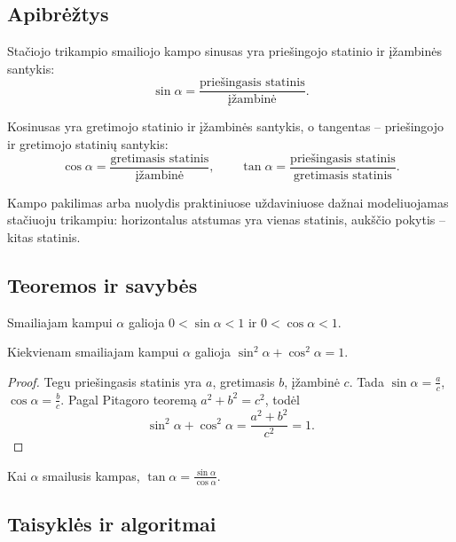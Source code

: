 \subsection{Apibrėžtys}

\begin{apibreztis}
Stačiojo trikampio smailiojo kampo sinusas yra priešingojo statinio ir įžambinės santykis:
\[
\sin\alpha=\frac{\text{priešingasis statinis}}{\text{įžambinė}}.
\]
\end{apibreztis}

\begin{apibreztis}
Kosinusas yra gretimojo statinio ir įžambinės santykis, o tangentas -- priešingojo ir gretimojo statinių santykis:
\[
\cos\alpha=\frac{\text{gretimasis statinis}}{\text{įžambinė}},\qquad
\tan\alpha=\frac{\text{priešingasis statinis}}{\text{gretimasis statinis}}.
\]
\end{apibreztis}

\begin{apibreztis}
Kampo pakilimas arba nuolydis praktiniuose uždaviniuose dažnai modeliuojamas stačiuoju trikampiu: horizontalus atstumas yra vienas statinis, aukščio pokytis -- kitas statinis.
\end{apibreztis}

\subsection{Teoremos ir savybės}

\begin{savybe}
Smailiajam kampui $\alpha$ galioja $0<\sin\alpha<1$ ir $0<\cos\alpha<1$.
\end{savybe}

\begin{teorema}
Kiekvienam smailiajam kampui $\alpha$ galioja $\sin^2\alpha+\cos^2\alpha=1$.
\end{teorema}
\begin{proof}
Tegu priešingasis statinis yra $a$, gretimasis $b$, įžambinė $c$. Tada $\sin\alpha=\frac ac$, $\cos\alpha=\frac bc$. Pagal Pitagoro teoremą $a^2+b^2=c^2$, todėl
\[
\sin^2\alpha+\cos^2\alpha=\frac{a^2+b^2}{c^2}=1.
\]
\end{proof}

\begin{savybe}
Kai $\alpha$ smailusis kampas, $\tan\alpha=\frac{\sin\alpha}{\cos\alpha}$.
\end{savybe}

\subsection{Taisyklės ir algoritmai}

